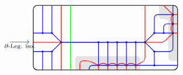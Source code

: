 \[\begin{tikzcd}
\begin{tikzpicture}[baseline=-.5ex,scale=0.4]
\end{tikzpicture}
\arrow[r, "\boundary\text{-Leg. iso.}"'] & 
\begin{tikzpicture}[baseline=-.5ex,scale=0.4]
\draw[rounded corners=5, thick] (-7.5, -3) rectangle (8, 4);
\clip[rounded corners=5] (-7.5, -3) rectangle (8, 4);
\fill[opacity=0.1, rounded corners] (-3, -4) -- (-3, -1.5) -- (4, -1.5) -- (4, -4) -- cycle;
\fill[opacity=0.1, rounded corners] (7, -2) -- (9,-2) -- (9, 5) -- (6, 5) -- (6, 2.5) -- (7, 2.5) -- cycle;
\draw[thick, red]
(-0.5, -2.5) -- (-0.5, -3)
(0.5, -2.5) -- (0.5, -3)
(1.5, -2.5) -- (1.5, -3)
(2.5, -2.5) -- (2.5, -3)
(3.5, -2.5) -- (3.5, -3)
;
\draw[thick, blue, fill]
(-0.5, -2.5) -- (-0.5,0) circle (2pt)
(0.5, -2.5) -- (0.5,0) circle (2pt)
(1.5, -2.5) -- (1.5,0) circle (2pt)
(2.5, -2.5) -- (2.5, 0) circle (2pt)
(3.5, -2.5) -- (3.5, 0) circle (2pt)
;
\draw[thick, blue, rounded corners]
(-0.5, -2.5) -- (-1.5, -2.5) -- (-1.5, -3)
(-0.5, -2.5) -- (3.5, -2.5) -- (8, -2.5)
;
\draw[thick, green, rounded corners] (-3.5, 4) -- (-3.5, -3);
\draw[thick, red] 
(-4.5, -3) -- (-4.5, 4)
(-7.5, 0) -- (-4.5, 0)
;
\draw[thick, red, rounded corners] 
(4.5, 4) -- (4.5, -2) -- (3.5, -2.5)
(-0.5, -2.5) to[out=45,in=135] (0.5, -2.5)
(0.5, -2.5) to[out=45,in=135] (1.5, -2.5)
(1.5, -2.5) to[out=45,in=135] (2.5, -2.5)
(2.5, -2.5) to[out=45,in=135] (3.5, -2.5)
(-0.5, -2.5) -- (-1.5, -2) -- (-2.5, -2) -- (-2.5, -3)
(4.5, 0) -- (6.5, 0) -- (7.5, 1)
(7.5,1) to[out=135, in=-135] (7.5,2)
(7.5,2) to[out=135, in=-135] (7.5,3)
(7.5,3) -- (6.5, 4)
(7.5,1) -- (8, 1)
(7.5,2) -- (8, 2)
(7.5,3) -- (8, 3)
;
\draw[thick, blue, fill] 
%
(-4.5, 0) -- (4.5, 0)
(-4.5, 0) -- (-5.5, 1) circle (2pt) -- (-5.5, 4)
(-5.5, 1) -- (-7.5, 1)
(-6.5, 1) circle (2pt) -- (-6.5, 4)
%
(-4.5, 0) -- (-5.5, -1) circle (2pt) -- (-5.5, -3)
(-5.5, -1) -- (-7.5, -1)
(-6.5, -1) circle (2pt) -- (-6.5, -3)
;
\draw[thick, blue, rounded corners]
(5.5, -1) -- (7.5, -1) -- (7.5, 4)
(5.5, 1) -- (5.5, 3) -- (7.5, 3)
(5.5, 1) -- (7.5, 1)
(6.5, 1) circle (2pt) -- (6.5, 2) -- (7.5, 2)
(5.5, -2.5) circle (2pt) -- (5.5, -1)
;
\begin{scope}[rotate=180]
\draw[thick, blue, fill] 
%
(-4.5, 0) -- (4.5, 0)
(-4.5, 0) -- (-5.5, 1) circle (2pt)
%
(-4.5, 0) -- (-5.5, -1) circle (2pt)
;
\end{scope}
\draw[thick, fill=white] 
(-4.5, 0) circle (2pt) (4.5, 0) circle (2pt)
(7.5, 1) circle (2pt) (7.5, 2) circle (2pt) (7.5, 3) circle (2pt)
(-0.5, -2.5) circle (2pt) (0.5, -2.5) circle (2pt) (1.5, -2.5) circle (2pt) (2.5, -2.5) circle (2pt) (3.5, -2.5) circle (2pt)
;
\end{tikzpicture}

\end{tikzcd}\]
